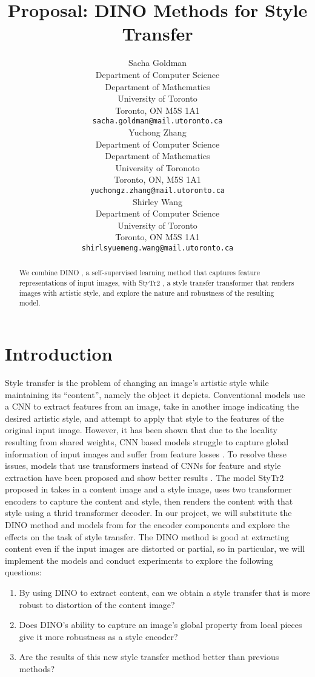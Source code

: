 \documentclass{article}
\title{Proposal: DINO Methods for Style Transfer}
\author{
  Sacha Goldman \\
  Department of Computer Science\\ 
  Department of Mathematics\\
  University of Toronto\\
  Toronto, ON M5S 1A1 \\
  \texttt{sacha.goldman@mail.utoronto.ca} \\
  \And
  Yuchong Zhang \\
  Department of Computer Science \\
  Department of Mathematics \\
  University of Toronoto \\
  Toronto, ON, M5S 1A1 \\
  \texttt{yuchongz.zhang@mail.utoronto.ca} \\
  \And
  Shirley Wang \\
  Department of Computer Science \\
  University of Toronto \\
  Toronto, ON M5S 1A1 \\
  \texttt{shirlsyuemeng.wang@mail.utoronto.ca} \\
}
\begin{document}
\maketitle

\begin{abstract}
We combine DINO \cite{DINO}, a self-supervised learning method that captures feature representations of input images, with StyTr2 \cite{ImageStyleTransformer}, a style transfer transformer that renders images with artistic style, and explore the nature and robustness of the resulting model.
\end{abstract}

\section{Introduction}
Style transfer is the problem of changing an image's artistic style while maintaining its ``content'', namely the object it depicts. Conventional models use a CNN to extract features from an image, take in another image indicating the desired artistic style, and attempt to apply that style to the features of the original input image. However, it has been shown that due to the locality resulting from shared weights, CNN based models struggle to capture global information of input images and suffer from feature losses \cite{ImageStyleTransformer}. To resolve these issues, models that use transformers instead of CNNs for feature and style extraction have been proposed and show better results \cite{ImageStyleTransformer}. The model StyTr2 proposed in \cite{ImageStyleTransformer} takes in a content image and a style image, uses two transformer encoders to capture the content and style, then renders the content with that style using a thrid transformer decoder. In our project, we will substitute the DINO method and models from \cite{DINO} for the encoder components and explore the effects on the task of style transfer. The DINO method is good at extracting content even if the input images are distorted or partial, so in particular, we will implement the models and conduct experiments to explore the following questions:
\begin{enumerate}
  \item By using DINO to extract content, can we obtain a style transfer that is more robust to distortion of the content image?
  \item Does DINO's ability to capture an image's global property from local pieces give it more robustness as a style encoder?
  \item Are the results of this new style transfer method better than previous methods?
\end{enumerate}
\end{document}
